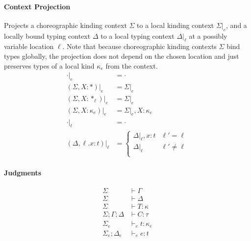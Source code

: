 \documentclass{article}
\theoremstyle{definition}
\newcommand\proj[2]{\ensuremath{\left.#1\right|_{#2}}}
\begin{document}
\paragraph{Context Projection}
Projects a choreographic kinding context $\Sigma$ to a local kinding context $\proj{\Sigma}{e}$, and a locally bound typing context $\Delta$ to a local typing context $\proj{\Delta}{\ell}$ at a possibly variable location $\ell$. Note that because choreographic kinding contexts $\Sigma$ bind types globally, the projection does not depend on the chosen location and just preserves types of a local kind $\kappa_e$ from the context.
\begin{align*}
	\proj{\cdot}{e} &= \cdot \\
	\proj{(\Sigma, X : *)}{e} &= \proj{\Sigma}{e}\\
	\proj{(\Sigma, X : *_\ell)}{e} &= \proj{\Sigma}{e}\\
	\proj{(\Sigma, X : \kappa_e)}{e} &= \proj{\Sigma}{e}, X : \kappa_e\\
	\proj{\cdot}{\ell} &= \cdot \\
	\proj{(\Delta, \ell.x : t)}{\ell} &=
	\begin{cases} 
		\proj{\Delta}{\ell}, x : t & \ell' = \ell \\
		\proj{\Delta}{\ell} & \ell' \neq \ell \\
	\end{cases}
\end{align*}

\paragraph{Judgments}
\begin{align*}
	\Sigma &\vdash \Gamma \tag{Choreographic Typing Context Well-Formedness}\\
	\Sigma &\vdash \Delta \tag{Locally Bound Typing Context Well-Formedness}\\
	\Sigma &\vdash T : \kappa \tag{Type Kinding Judgment}\\
	\Sigma; \Gamma; \Delta &\vdash C : \tau \tag{Choreography Typing Judgment}\\
	\Sigma_e &\vdash_e t : \kappa_e \tag{Local Type Kinding Judgment}\\
	\Sigma_e;\Delta_e &\vdash_e e : t \tag{Local Expression Typing Judgment}
\end{align*}
\end{document}
